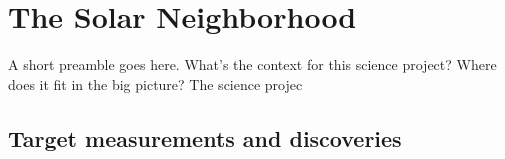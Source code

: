%
%
%
%
%
%
%
%

\section{The Solar Neighborhood}
\def\secname{solarneighborhood}\label{sec:\secname} %



A short preamble goes here. What's the context for this science
project? Where does it fit in the big picture?
The science projec


\subsection{Target measurements and discoveries}
\label{sec:keyword:targets}

